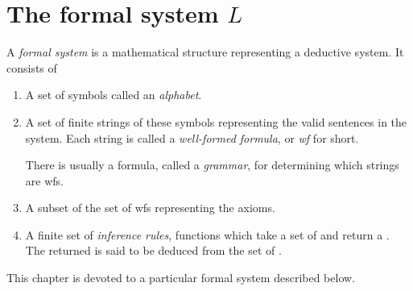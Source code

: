 
\section{The formal system \texorpdfstring{\(L\)}{L}}

A \textit{formal system} is a mathematical structure representing a deductive system. It consists of
\begin{enumerate}
  \item A set of symbols called an \textit{alphabet}.

  \item A set of finite strings of these symbols representing the valid sentences in the system. Each string is called a \textit{well-formed formula}, or \textit{wf} for short.

    There is usually a formula, called a \textit{grammar}, for determining which strings are wfs.

  \item A subset of the set of wfs representing the axioms.

  \item A finite set of \textit{inference rules}, functions which take a set of \wfs{} and return a \wf{}. The returned \wf{} is said to be deduced from the set of \wfs{}.
\end{enumerate}

This chapter is devoted to a particular formal system described below.

